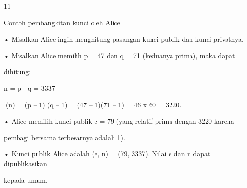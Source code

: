 \documentclass{article}
\begin{document}

11

Contoh pembangkitan kunci oleh Alice

• Misalkan Alice ingin menghitung pasangan kunci publik dan kunci privatnya. 

• Misalkan Alice memilih p = 47 dan q = 71 (keduanya prima), maka dapat 

dihitung: 


n = p  q = 3337 


(n) = (p – 1)(q – 1) = (47 – 1)(71 – 1) = 46 x 60 = 3220. 

• Alice memilih kunci publik e = 79 (yang relatif prima dengan 3220 karena 

pembagi bersama terbesarnya adalah 1).  

• Kunci publik Alice adalah (e, n) = (79, 3337). Nilai e dan n dapat dipublikasikan 

kepada umum.
\end{document}
